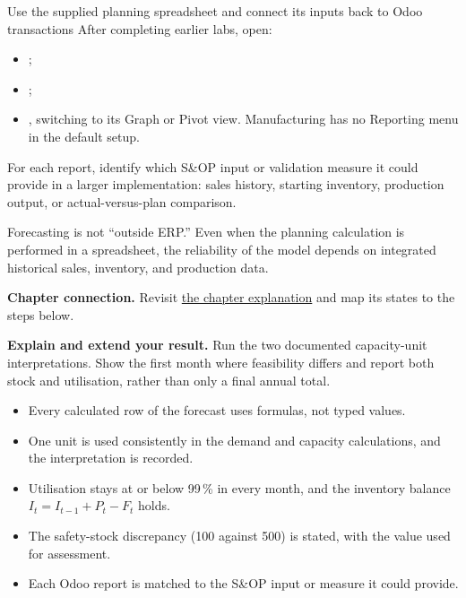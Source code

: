 \begin{labproject}{Use the supplied planning spreadsheet and connect its inputs back to Odoo transactions}
After completing earlier labs, open:
\begin{itemize}
  \item {};
  \item {};
  \item {}, switching to its Graph or Pivot view. Manufacturing has no Reporting menu in the default setup.
\end{itemize}

For each report, identify which S\&OP input or validation measure it could provide in a larger implementation: sales history, starting inventory, production output, or actual-versus-plan comparison.

\begin{keyidea}
Forecasting is not ``outside ERP.'' Even when the planning calculation is performed in a spreadsheet, the reliability of the model depends on integrated historical sales, inventory, and production data.
\end{keyidea}
\end{labproject}

\textbf{Chapter connection.} Revisit \hyperref[ch:forecasting-sop]{the chapter explanation} and map its states to the steps below.




\begin{verification}
\textbf{Explain and extend your result.} Run the two documented capacity-unit interpretations. Show the first month where feasibility differs and report both stock and utilisation, rather than only a final annual total.


\begin{itemize}
  \item Every calculated row of the forecast uses formulas, not typed values.
  \item One unit is used consistently in the demand and capacity calculations, and the interpretation is recorded.
  \item Utilisation stays at or below 99\,\% in every month, and the inventory balance $I_t=I_{t-1}+P_t-F_t$ holds.
  \item The safety-stock discrepancy (100 against 500) is stated, with the value used for assessment.
  \item Each Odoo report is matched to the S\&OP input or measure it could provide.
\end{itemize}
\end{verification}

